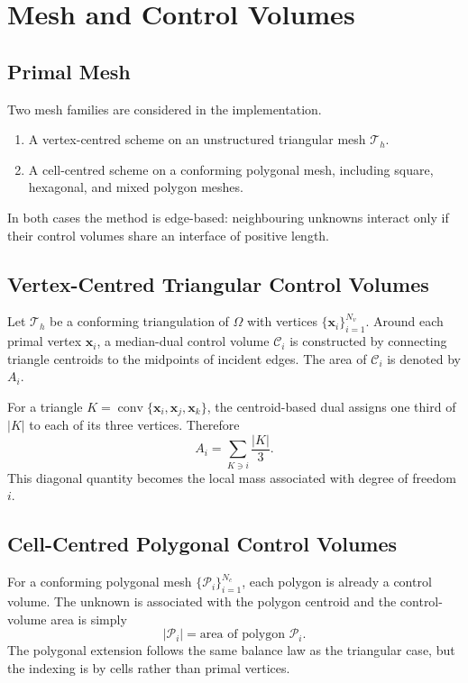 \documentclass[11pt]{article}
\theoremstyle{plain}
\theoremstyle{definition}
\theoremstyle{remark}
\numberwithin{equation}{section}
\begin{document}
\section{Mesh and Control Volumes}
\subsection{Primal Mesh}
Two mesh families are considered in the implementation.
\begin{enumerate}[label=\arabic*.]
\item A vertex-centred scheme on an unstructured triangular mesh $\mathcal{T}_h$.
\item A cell-centred scheme on a conforming polygonal mesh, including square, hexagonal, and mixed polygon meshes.
\end{enumerate}

In both cases the method is edge-based: neighbouring unknowns interact only if their control volumes share an interface of positive length.

\subsection{Vertex-Centred Triangular Control Volumes}
Let $\mathcal{T}_h$ be a conforming triangulation of $\Omega$ with vertices $\{\bm{x}_i\}_{i=1}^{N_v}$. Around each primal vertex $\bm{x}_i$, a median-dual control volume $\mathcal{C}_i$ is constructed by connecting triangle centroids to the midpoints of incident edges. The area of $\mathcal{C}_i$ is denoted by $A_i$.

For a triangle $K = \operatorname{conv}\{\bm{x}_i,\bm{x}_j,\bm{x}_k\}$, the centroid-based dual assigns one third of $|K|$ to each of its three vertices. Therefore
\begin{equation}
\label{eq:cv_area}
A_i = \sum_{K \ni i} \frac{|K|}{3}.
\end{equation}
This diagonal quantity becomes the local mass associated with degree of freedom $i$.

\subsection{Cell-Centred Polygonal Control Volumes}
For a conforming polygonal mesh $\{\mathcal{P}_i\}_{i=1}^{N_c}$, each polygon is already a control volume. The unknown is associated with the polygon centroid and the control-volume area is simply
\begin{equation}
|\mathcal{P}_i| = \text{area of polygon } \mathcal{P}_i.
\end{equation}
The polygonal extension follows the same balance law as the triangular case, but the indexing is by cells rather than primal vertices.
\end{document}
